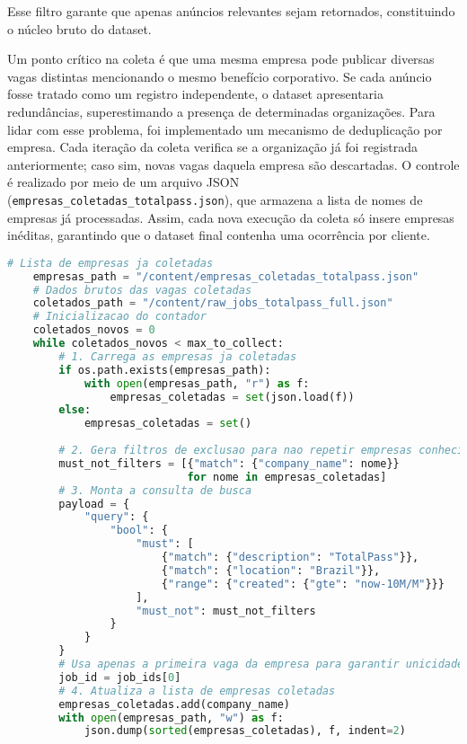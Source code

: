 Esse filtro garante que apenas anúncios relevantes sejam retornados, constituindo o núcleo bruto do dataset.

Um ponto crítico na coleta é que uma mesma empresa pode publicar diversas vagas distintas mencionando o mesmo benefício corporativo. Se cada anúncio fosse tratado como um registro independente, o dataset apresentaria redundâncias, superestimando a presença de determinadas organizações. Para lidar com esse problema, foi implementado um mecanismo de deduplicação por empresa. Cada iteração da coleta verifica se a organização já foi registrada anteriormente; caso sim, novas vagas daquela empresa são descartadas. O controle é realizado por meio de um arquivo JSON (\texttt{empresas\_coletadas\_totalpass.json}), que armazena a lista de nomes de empresas já processadas. Assim, cada nova execução da coleta só insere empresas inéditas, garantindo que o dataset final contenha uma ocorrência por cliente.

\begin{lstlisting}[language=Python, caption={Deduplicação de empresas na coleta}, label={lst:deduplicacao}]
    # Lista de empresas ja coletadas
    empresas_path = "/content/empresas_coletadas_totalpass.json"
    # Dados brutos das vagas coletadas
    coletados_path = "/content/raw_jobs_totalpass_full.json"
    # Inicializacao do contador
    coletados_novos = 0
    while coletados_novos < max_to_collect:
        # 1. Carrega as empresas ja coletadas
        if os.path.exists(empresas_path):
            with open(empresas_path, "r") as f:
                empresas_coletadas = set(json.load(f))
        else:
            empresas_coletadas = set()
    
        # 2. Gera filtros de exclusao para nao repetir empresas conhecidas
        must_not_filters = [{"match": {"company_name": nome}} 
                            for nome in empresas_coletadas]
        # 3. Monta a consulta de busca
        payload = {
            "query": {
                "bool": {
                    "must": [
                        {"match": {"description": "TotalPass"}},
                        {"match": {"location": "Brazil"}},
                        {"range": {"created": {"gte": "now-10M/M"}}}
                    ],
                    "must_not": must_not_filters
                }
            }
        }
        # Usa apenas a primeira vaga da empresa para garantir unicidade
        job_id = job_ids[0]
        # 4. Atualiza a lista de empresas coletadas
        empresas_coletadas.add(company_name)
        with open(empresas_path, "w") as f:
            json.dump(sorted(empresas_coletadas), f, indent=2)
    \end{lstlisting}

